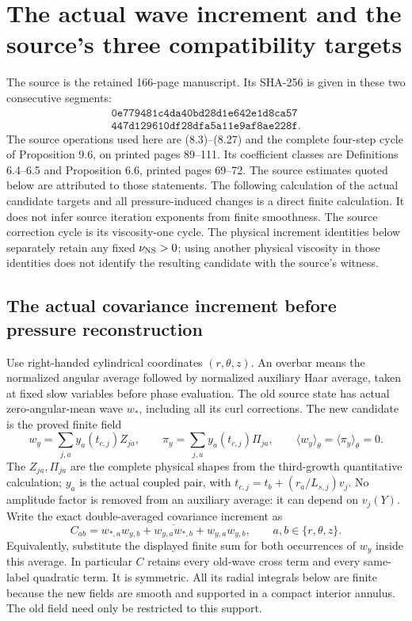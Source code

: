 \documentclass[11pt]{article}
\begin{document}
\section{The actual wave increment and the source's three compatibility targets}
\label{momop:section}

The source is the retained 166-page manuscript. Its SHA-256 is given
in these two consecutive segments:
\[
\begin{gathered}
\texttt{0e779481c4da40bd28d1e642e1d8ca57}\\
\texttt{447d129610df28dfa5a11e9af8ae228f}.
\end{gathered}
\]
The source operations used here are (8.3)--(8.27) and the complete
four-step cycle of Proposition 9.6, on printed pages 89--111.
Its coefficient classes are Definitions 6.4--6.5 and Proposition 6.6,
printed pages 69--72. The source estimates quoted below are attributed
to those statements. The following calculation of the actual candidate
targets and all pressure-induced changes is a direct finite calculation.
It does not infer source iteration exponents from finite smoothness.
The source correction cycle is its viscosity-one cycle. The physical
increment identities below separately retain any fixed
$\nu_{\rm NS}>0$; using another physical viscosity in those identities
does not identify the resulting candidate with the source's witness.

\subsection{The actual covariance increment before pressure reconstruction}

Use right-handed cylindrical coordinates $(r,\theta,z)$. An overbar
means the normalized angular average followed by normalized auxiliary
Haar average, taken at fixed slow variables before phase evaluation.
The old source state has actual zero-angular-mean wave $w_*$, including
all its curl corrections. The new candidate is the proved finite field
\[
 w_y=\sum_{j,a}y_a(t_{c,j})Z_{ja},\qquad
 \pi_y=\sum_{j,a}y_a(t_{c,j})\Pi_{ja},\qquad
 \langle w_y\rangle_\theta=\langle\pi_y\rangle_\theta=0.
\]
The $Z_{ja},\Pi_{ja}$ are the complete physical shapes from the
third-growth quantitative calculation; $y_a$ is the actual coupled
pair, with $t_{c,j}=t_b+(r_a/L_{s,j})v_j$. No amplitude factor is
removed from an auxiliary average: it can depend on $v_j(Y)$.
Write the exact double-averaged covariance increment as
\begin{equation}\label{momop:C}
 C_{ab}=
 \overline{w_{*,a}w_{y,b}+w_{y,a}w_{*,b}+w_{y,a}w_{y,b}},
 \qquad a,b\in\{r,\theta,z\}.
\end{equation}
Equivalently, substitute the displayed finite sum for both occurrences
of $w_y$ inside this average. In particular $C$ retains every old-wave
cross term and every same-label quadratic term. It is symmetric.
All its radial integrals below are finite because the new fields are
smooth and supported in a compact interior annulus. The old field
need only be restricted to this support.
\end{document}
